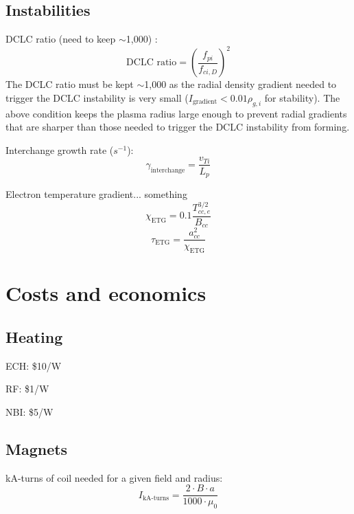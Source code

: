 \subsection{Instabilities}

DCLC ratio (need to keep $\sim$1,000) \cite{kotelnikov_chernoshtanov_prikhodko_2017,post_1966}:
\begin{equation}
    \text{DCLC ratio} = \left( \frac{f_{pi}}{f_{ci,D}} \right) ^2
\end{equation}
The DCLC ratio must be kept $\sim$1,000 as the radial density gradient needed to trigger the DCLC instability is very small ($I_{\text{gradient}}<0.01\rho_{g,i}$ for stability). The above condition keeps the plasma radius large enough to prevent radial gradients that are sharper than those needed to trigger the DCLC instability from forming.

Interchange growth rate ($s^{-1}$):
\begin{equation}
    \gamma_{\text{interchange}}=\frac{v_{Ti}}{L_p}
\end{equation}

Electron temperature gradient... something 
\begin{equation}
    \chi_{\text{ETG}} = 0.1 \frac{T_{cc,e}^{3/2}}{B_{cc}}
\end{equation}
\begin{equation}
    \tau_{\text{ETG}} = \frac{a_{cc}^2}{\chi_{\text{ETG}}}
\end{equation}

\section{Costs and economics}

\subsection{Heating} 

ECH: \$10/W

RF: \$1/W

NBI: \$5/W

\subsection{Magnets} 

kA-turns of coil needed for a given field and radius:
\begin{equation}
    I_\text{kA-turns} = \frac{2 \cdot B \cdot a}{1000 \cdot \mu_0}
\end{equation}

